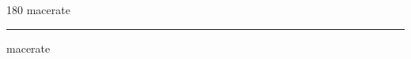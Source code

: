 
\begin{frame}
\begin{center}
\begin{turn}{180}
{\fontsize{2.5cm}{1em}\selectfont macerate}
\end{turn}
\vspace{1em}\par  
\hrule
\vspace{1em}\par  
{\fontsize{2.5cm}{1em}\selectfont macerate}
\end{center}
\end{frame}
